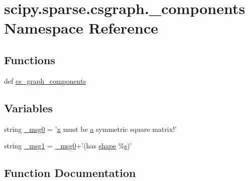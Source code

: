 \hypertarget{namespacescipy_1_1sparse_1_1csgraph_1_1__components}{}\section{scipy.\+sparse.\+csgraph.\+\_\+components Namespace Reference}
\label{namespacescipy_1_1sparse_1_1csgraph_1_1__components}
\subsection*{Functions}
\begin{DoxyCompactItemize}
\item 
def \hyperlink{namespacescipy_1_1sparse_1_1csgraph_1_1__components_a7cc89135ad9707bda3c24fc3ee887588}{cs\+\_\+graph\+\_\+components}
\end{DoxyCompactItemize}
\subsection*{Variables}
\begin{DoxyCompactItemize}
\item 
string \hyperlink{namespacescipy_1_1sparse_1_1csgraph_1_1__components_a85bc8d379704c7577c9544bb51e90030}{\+\_\+msg0} = '\hyperlink{vecnorm1_8cc_ac73eed9e41ec09d58f112f06c2d6cb63}{x} must be \hyperlink{gen__mat5files_8m_aae328bf20413f220e38aec4d95bfd6da}{a} symmetric square matrix!'
\item 
string \hyperlink{namespacescipy_1_1sparse_1_1csgraph_1_1__components_a14ac0d16483cf73d38dc6d1d549da9f6}{\+\_\+msg1} = \hyperlink{namespacescipy_1_1sparse_1_1csgraph_1_1__components_a85bc8d379704c7577c9544bb51e90030}{\+\_\+msg0}+'(has \hyperlink{shape_8h_a9d9da3dcaecbbde6cf1961063f2e838b}{shape} \%\hyperlink{indexexpr_8h_ae024b0db549122b44c349ae28ec990dc}{s})'
\end{DoxyCompactItemize}


\subsection{Function Documentation}
\hypertarget{namespacescipy_1_1sparse_1_1csgraph_1_1__components_a7cc89135ad9707bda3c24fc3ee887588}{}
